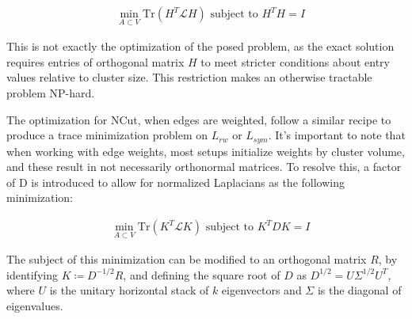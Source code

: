 \documentclass[letterpaper,12pt]{article}
\begin{document}
\begin{align}
   &\min_{A \subset V} \text{Tr}(H^T \mathcal{L} H) \text{ subject to $H^T H = I$}  
\end{align}

This is not exactly the optimization of the posed problem, as the exact solution requires entries of orthogonal matrix $H$ to meet stricter conditions about entry values relative to cluster size. This restriction makes an otherwise tractable problem NP-hard.

\noindent
The optimization for NCut, when edges are weighted, follow a similar recipe to produce a trace minimization problem on $L_{rw}$ or $L_{sym}$. It's important to note that when working with edge weights, most setups initialize weights by cluster volume, and these result in not necessarily orthonormal matrices. To resolve this, a factor of D is introduced to allow for normalized Laplacians as the following minimization:

\begin{align}
   &\min_{A \subset V} \text{Tr}(K^T \mathcal{L} K) \text{ subject to $K^T D K = I$}  
\end{align}

The subject of this minimization can be modified to an orthogonal matrix $R$, by identifying $K\coloneqq D^{-1/2}R$, and defining the square root of $D$ as $D^{1/2} = U \Sigma^{1/2} U^T$, where $U$ is the unitary horizontal stack of $k$ eigenvectors and $\Sigma$ is the diagonal of eigenvalues.
\end{document}
